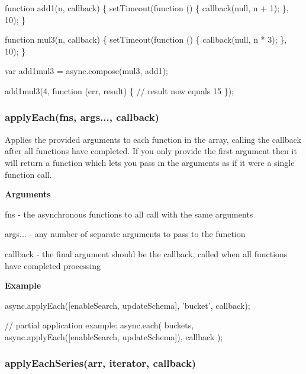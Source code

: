 \begin{DoxyCode}
\textcolor{keyword}{function} add1(n, callback) \{
    setTimeout(\textcolor{keyword}{function} () \{
        callback(null, n + 1);
    \}, 10);
\}

\textcolor{keyword}{function} mul3(n, callback) \{
    setTimeout(\textcolor{keyword}{function} () \{
        callback(null, n * 3);
    \}, 10);
\}

var add1mul3 = async.compose(mul3, add1);

add1mul3(4, \textcolor{keyword}{function} (err, result) \{
   \textcolor{comment}{// result now equals 15}
\});
\end{DoxyCode}
 

 \label{_applyEach}%
 \subsubsection*{apply\+Each(fns, args..., callback)}

Applies the provided arguments to each function in the array, calling the callback after all functions have completed. If you only provide the first argument then it will return a function which lets you pass in the arguments as if it were a single function call.

{\bfseries Arguments}


\begin{DoxyItemize}
\item fns -\/ the asynchronous functions to all call with the same arguments
\item args... -\/ any number of separate arguments to pass to the function
\item callback -\/ the final argument should be the callback, called when all functions have completed processing
\end{DoxyItemize}

{\bfseries Example}


\begin{DoxyCode}
async.applyEach([enableSearch, updateSchema], \textcolor{stringliteral}{'bucket'}, callback);

\textcolor{comment}{// partial application example:}
async.each(
    buckets,
    async.applyEach([enableSearch, updateSchema]),
    callback
);
\end{DoxyCode}
 



\label{_applyEachSeries}%
 \subsubsection*{apply\+Each\+Series(arr, iterator, callback)}

